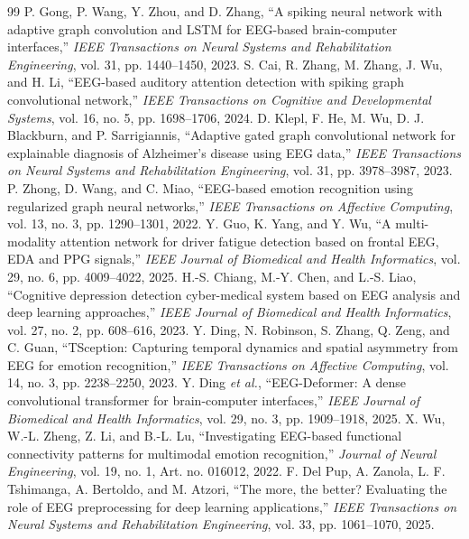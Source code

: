 \documentclass[journal]{IEEEtran}
\begin{document}
\begin{thebibliography}{99}
 P. Gong, P. Wang, Y. Zhou, and D. Zhang, ``A spiking neural network with adaptive graph convolution and LSTM for EEG-based brain-computer interfaces,'' \emph{IEEE Transactions on Neural Systems and Rehabilitation Engineering}, vol. 31, pp. 1440--1450, 2023.
 S. Cai, R. Zhang, M. Zhang, J. Wu, and H. Li, ``EEG-based auditory attention detection with spiking graph convolutional network,'' \emph{IEEE Transactions on Cognitive and Developmental Systems}, vol. 16, no. 5, pp. 1698--1706, 2024.
 D. Klepl, F. He, M. Wu, D. J. Blackburn, and P. Sarrigiannis, ``Adaptive gated graph convolutional network for explainable diagnosis of Alzheimer's disease using EEG data,'' \emph{IEEE Transactions on Neural Systems and Rehabilitation Engineering}, vol. 31, pp. 3978--3987, 2023.
 P. Zhong, D. Wang, and C. Miao, ``EEG-based emotion recognition using regularized graph neural networks,'' \emph{IEEE Transactions on Affective Computing}, vol. 13, no. 3, pp. 1290--1301, 2022.
 Y. Guo, K. Yang, and Y. Wu, ``A multi-modality attention network for driver fatigue detection based on frontal EEG, EDA and PPG signals,'' \emph{IEEE Journal of Biomedical and Health Informatics}, vol. 29, no. 6, pp. 4009--4022, 2025.
 H.-S. Chiang, M.-Y. Chen, and L.-S. Liao, ``Cognitive depression detection cyber-medical system based on EEG analysis and deep learning approaches,'' \emph{IEEE Journal of Biomedical and Health Informatics}, vol. 27, no. 2, pp. 608--616, 2023.
 Y. Ding, N. Robinson, S. Zhang, Q. Zeng, and C. Guan, ``TSception: Capturing temporal dynamics and spatial asymmetry from EEG for emotion recognition,'' \emph{IEEE Transactions on Affective Computing}, vol. 14, no. 3, pp. 2238--2250, 2023.
 Y. Ding \emph{et al.}, ``EEG-Deformer: A dense convolutional transformer for brain-computer interfaces,'' \emph{IEEE Journal of Biomedical and Health Informatics}, vol. 29, no. 3, pp. 1909--1918, 2025.
 X. Wu, W.-L. Zheng, Z. Li, and B.-L. Lu, ``Investigating EEG-based functional connectivity patterns for multimodal emotion recognition,'' \emph{Journal of Neural Engineering}, vol. 19, no. 1, Art. no. 016012, 2022.
 F. Del Pup, A. Zanola, L. F. Tshimanga, A. Bertoldo, and M. Atzori, ``The more, the better? Evaluating the role of EEG preprocessing for deep learning applications,'' \emph{IEEE Transactions on Neural Systems and Rehabilitation Engineering}, vol. 33, pp. 1061--1070, 2025.

\end{thebibliography}
\end{document}
